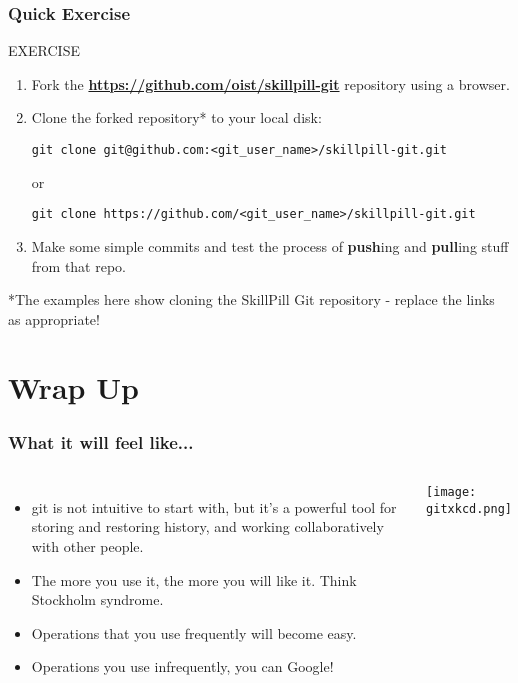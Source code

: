 \documentclass{beamer}
\begin{document}
\begin{frame}
\frametitle{Quick Exercise}
    \begin{block}{EXERCISE}
        \begin{enumerate}
        \item Fork the \textbf{\href{https://github.com/oist/skillpill-git}{https://github.com/oist/skillpill-git}} repository using a browser.
        \item Clone the forked repository* to your local disk:
        \begin{lstlisting}
git clone git@github.com:<git_user_name>/skillpill-git.git
        \end{lstlisting}
        or
        \begin{lstlisting}
git clone https://github.com/<git_user_name>/skillpill-git.git
        \end{lstlisting}
        \item Make some simple commits and test the process of \textbf{push}ing and \textbf{pull}ing stuff from that repo.
        \end{enumerate}
    \end{block}

*The examples here show cloning the SkillPill Git repository - replace the links as appropriate!
\end{frame}

\section{Wrap Up}

\begin{frame}
\frametitle{What it will feel like...}
\begin{columns}
\begin{itemize}
\item git is not intuitive to start with, but it's %
a powerful tool for storing and restoring history, and working collaboratively with other people.
\item The more you use it, the more you will like it. Think Stockholm syndrome.
\item Operations that you use frequently will become easy.
\item Operations you use infrequently, you can Google!
\end{itemize}
\texttt{[image: gitxkcd.png]}
\end{columns}
\end{frame}
\end{document}
